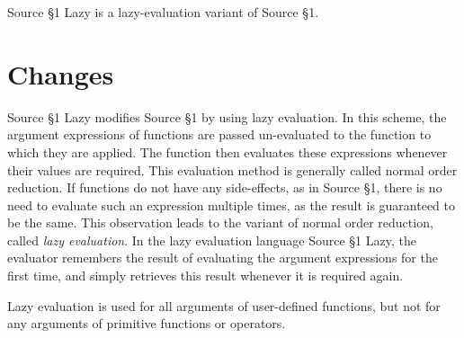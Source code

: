 





Source \S 1 Lazy is a lazy-evaluation variant of Source \S 1.

\section*{Changes}

Source \S 1 Lazy modifies Source \S 1 by using
lazy evaluation. In
this scheme, the argument expressions of functions are passed un-evaluated
to the function to which they are applied. The function then evaluates
these expressions whenever their values are required. This evaluation method
is generally called normal order reduction. If functions
do not have any side-effects, as in Source \S 1,
there is no need to evaluate such an expression
multiple times, as the result is guaranteed to be the same. This observation
leads to the variant of normal order reduction, called \emph{lazy evaluation}.
In the lazy evaluation language Source \S 1 Lazy,
the evaluator remembers the result of evaluating the
argument expressions for the first time, and simply retrieves this result
whenever it is required again.

Lazy evaluation is used for all arguments of user-defined functions, but
not for any arguments of primitive functions or operators.





\newpage


















    
